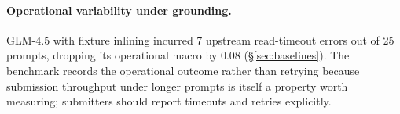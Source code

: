 \paragraph{Operational variability under grounding.} GLM-4.5 with
fixture inlining incurred 7 upstream read-timeout errors out of 25
prompts, dropping its operational macro by $0.08$
(\S\ref{sec:baselines}). The benchmark records the operational outcome
rather than retrying because submission throughput under longer prompts
is itself a property worth measuring; submitters should report timeouts
and retries explicitly.
